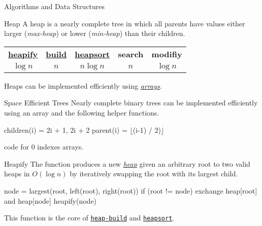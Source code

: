\documentclass{cognito}
\begin{document}
\lstset{language=C}
\lstset{mathescape=true}


\begin{note}{Algorithms and Data Structures}
\end{note}



\begin{note}{Heap}
	A heap is a nearly complete tree in which all parents have values
	either larger (\emph{max-heap}) or lower (\emph{min-heap}) than their children.
	\begin{mdframed}[linecolor=black!25!white]%
	\begin{tabular}{@{} c | c | c | c | c  @{}}
		\hyperref[note:Heapify]{\bf heapify} &
			\hyperref[note:Building a Heap]{\bf build} & \hyperref[note:Heapsort]{\bf heapsort} & \bf search & \bf modifiy \\
		$\log n$ & $n$ & $n \log n$ & $n$ & $\log n$
	\end{tabular}%
	\end{mdframed}
	\begin{remark} Heaps can be implemented efficiently using \hyperref[note:Space Efficient Trees]{\it arrays}. \end{remark}
	\vspace{-5pt}
\end{note}

\begin{note}{Space Efficient Trees}
	Nearly complete binary trees can be implemented efficiently using an array and
	the following helper functions.
	\begin{largecode}
 children(i) = { 2i + 1, 2i + 2 }
 parent(i)   = $\lfloor$(i-1) / 2)$\rfloor$
	\end{largecode}
	\begin{remark} code for 0 indexes arrays. \end{remark}
	\vspace{-5pt}
\end{note}


\begin{note}{Heapify}
	The  function produces a new \hyperref[note:Heap]{\emph{heap}} given an arbitrary root to two
	valid heaps in $O(\log n)$ by iteratively swapping the root with its largest child.
	\begin{largecode}
 node = largest(root, left(root), right(root))
 if (root != node) {
 	exchange heap[root] and heap[node]
 	heapify(node)
 }
	\end{largecode}	
	\begin{remark} This function is the core of \hyperref[note:Building a Heap]{\tt heap-build} and \hyperref[note:Heapsort]{\tt heapsort}. \end{remark}
	\vspace{-5pt}
\end{note}
\end{document}
